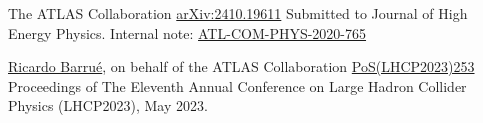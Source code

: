 
\begin{cventries}
    {The ATLAS Collaboration}{}
    {\href{https://arxiv.org/abs/2410.19611}{arXiv:2410.19611}}
    {
        Submitted to Journal of High Energy Physics. Internal note: \href{https://cds.cern.ch/record/2743096}{ATL-COM-PHYS-2020-765}
    }    
\end{cventries}\vspace*{2mm}




\begin{cventries}
    {\underline{Ricardo Barrué}, on behalf of the ATLAS Collaboration}{}
    {\href{https://pos.sissa.it/450/253/}{PoS(LHCP2023)253}}
    {
        Proceedings of The Eleventh Annual Conference on Large Hadron Collider Physics (LHCP2023), May 2023.
    }
\end{cventries}\vspace*{2mm}


